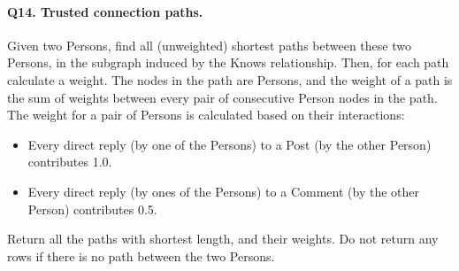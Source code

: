 \paragraph{\textbf{Q14}. Trusted connection paths.}
Given two Persons, find all (unweighted) shortest paths between these
two Persons, in the subgraph induced by the Knows relationship.
Then, for each path calculate a weight. The nodes in the path are
Persons, and the weight of a path is the sum of weights between every
pair of consecutive Person nodes in the path.
The weight for a pair of Persons is calculated based on their
interactions:
\begin{itemize}
\tightlist
\item
  Every direct reply (by one of the Persons) to a Post (by the other
  Person) contributes 1.0.
\item
  Every direct reply (by ones of the Persons) to a Comment (by the other
  Person) contributes 0.5.
\end{itemize}
Return all the paths with shortest length, and their weights. Do not
return any rows if there is no path between the two Persons.
